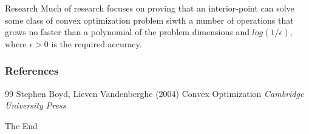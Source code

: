 \documentclass{beamer}
\begin{document}

\begin{frame}{Research}
Much of research focuses on proving that an interior-point can solve some class of convex optimization problem siwth a number of operations that grows no faster than a polynomial of the problem dimensions and $log(1/\epsilon)$, where $\epsilon > 0$ is the required accuracy.
\end{frame}


\begin{frame}
\frametitle{References}
\footnotesize{
\begin{thebibliography}{99}
 Stephen Boyd, Lieven Vandenberghe (2004)
\newblock Convex Optimization
\newblock \emph{Cambridge University Press}
\end{thebibliography}
}
\end{frame}


\begin{frame}
\Huge{\centerline{The End}}
\end{frame}

\end{document}
